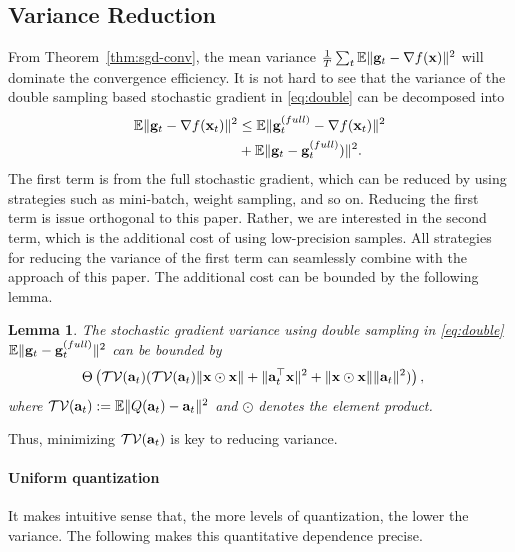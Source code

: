 \documentclass{article}
\def\a{{\bf a}}
\def\g{{\bf g}}
\def\x{{\bf x}}
\def\E{\mathbb{E}}
\newtheorem{lemma}{Lemma}
\begin{document}
\vspace{-0.5em}
\subsection{Variance Reduction}
\vspace{-0.5em}

From Theorem~\ref{thm:sgd-conv}, the mean variance ${1\over T}\sum_{t}\E\|\g_t - \nabla f(\x)\|^2$ will dominate the convergence efficiency. It is not hard to see that the variance of the double sampling based stochastic gradient in \eqref{eq:double} can be decomposed into
\vspace{-0.5em}
\begin{align*}
\E\|\g_t - \nabla f(\x_t)\|^2 & \leq \E \|\g_t^{(full)}- \nabla f(\x_t)\|^2 
\\
&+ \E \|\g_t - \g_t^{(full)})\|^2.
\end{align*}
The first term is from the full stochastic gradient, which can be reduced by using strategies such as mini-batch, weight sampling, and so on. Reducing the first term is issue orthogonal to this paper. 
Rather, we are interested in the second term, which is the additional cost of using low-precision samples. All strategies for reducing the variance of the first term can seamlessly combine with the approach of this paper. 
The additional cost can be bounded by the following lemma.
\begin{lemma} 
The stochastic gradient variance using double sampling in \eqref{eq:double} $\E\|\g_t - \g_t^{(full)}\|^2$ can be bounded by
\begin{align*}
&\Theta\left(\mathcal{TV}(\a_t) (\mathcal{TV}(\a_t)\|\x\odot \x\| + \|\a_t^\top \x\|^2 + \|\x\odot \x\|\|\a_t\|^2)\right),
\end{align*}
where $\mathcal{TV}(\a_t) := \E\|Q(\a_t) - \a_t\|^2$ and $\odot$ denotes the element product.
\end{lemma}
Thus, minimizing $\mathcal{TV}(\a_t)$ is key to reducing variance. 

\vspace{-0.5em}
\paragraph{Uniform quantization} It makes intuitive sense that, the more levels of quantization, the lower the variance. The following  makes this quantitative dependence precise. 
\end{document}
